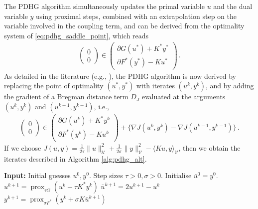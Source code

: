 The PDHG algorithm simultaneously updates the primal variable $u$ and the dual variable $y$ using proximal steps, combined with an extrapolation step on the variable involved in the coupling term, and can be derived from the optimality system of \eqref{eq:pdhg_saddle_point}, which reads
\begin{align*}
    \begin{pmatrix}
        0\\ 0
    \end{pmatrix} \in \begin{pmatrix}
        \partial G(u^\ast) + K^\ast y^\ast \\ \partial F^\ast(y^\ast) - Ku^\ast
    \end{pmatrix} \, . 
\end{align*}
As detailed in the literature (e.g., \cite{benning2018modern}), the PDHG algorithm is now derived by replacing the point of optimality $(u^\ast, y^\ast)$ with iterates $(u^k, y^k)$, and by adding the gradient of a Bregman distance term $D_J$ evaluated at the arguments $(u^k, y^k)$ and $(u^{k - 1}, y^{k - 1})$, i.e.,
\begin{align*}
    \begin{pmatrix}
        0\\ 0
    \end{pmatrix} \in \begin{pmatrix}
        \partial G(u^k) + K^\ast y^k \\ \partial F^\ast(y^k) - Ku^k
    \end{pmatrix} + \{ \nabla J(u^k, y^k) - \nabla J(u^{k - 1}, y^{k - 1}) \} \, . 
\end{align*}
If we choose $J(u, y) = \frac{1}{2\tau} \| u \|^2_{\mathcal{U}} + \frac{1}{2\sigma} \| y \|^2_{\mathcal{V}} - \langle Ku, y \rangle_{\mathcal{V}}$, then we obtain the iterates described in Algorithm \ref{alg:pdhg_alt}.
\begin{algorithm}
\caption{Primal-Dual Hybrid Gradient (PDHG) / Chambolle-Pock}\label{alg:pdhg_alt}
\begin{algorithmic}
\State \textbf{Input:} Initial guesses $u^0, y^0$. Step sizes $\tau > 0, \sigma > 0$. Initialise $\bar{u}^0 = y^0$.
\State $u^{k+1} = \operatorname{prox}_{\tau G}(u^k - \tau K^* y^{k})$ 
\State $\bar{u}^{k+1} = 2 u^{k+1} - u^k$ 
\State $y^{k+1} = \operatorname{prox}_{\sigma F^*}(y^k + \sigma K \bar{u}^{k + 1})$ 
\EndFor
\end{algorithmic}
\end{algorithm}
